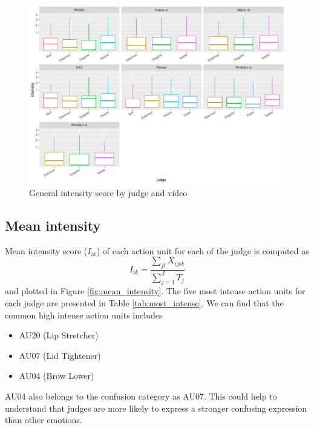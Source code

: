 \documentclass{monashthesis}
\begin{document}
\begin{figure}

{\centering \includegraphics[width=1\linewidth]{figures/unnamed-chunk-14-1} 

}

\caption{General intensity score by judge and video\label{fig:intensity}}\label{fig:unnamed-chunk-14}
\end{figure}

\hypertarget{mean-intensity}{%
\subsection{Mean intensity}\label{mean-intensity}}

Mean intensity score (\(I_{ik}\)) of each action unit for each of the judge is computed as \[I_{ik} = \frac{\sum_{jt}X_{ijtk}}{\sum_{j = 1}^JT_j}\] and plotted in Figure \ref{fig:mean_intensity}. The five most intense action units for each judge are presented in Table \ref{tab:most_intense}. We can find that the common high intense action units includes

\begin{itemize}
\tightlist
\item
  AU20 (Lip Stretcher)
\item
  AU07 (Lid Tightener)
\item
  AU04 (Brow Lower)
\end{itemize}

AU04 also belongs to the confusion category as AU07. This could help to understand that judges are more likely to express a stronger confusing expression than other emotions.
\end{document}
